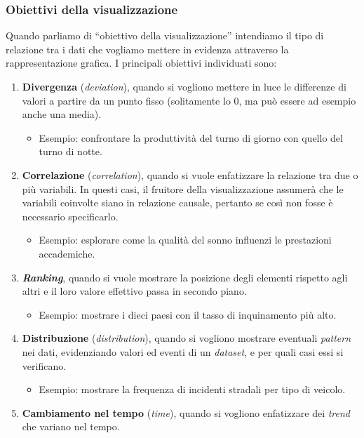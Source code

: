 \subsubsection{Obiettivi della visualizzazione}\label{subsubsec:obj}
Quando parliamo di ``obiettivo della visualizzazione'' intendiamo il tipo di relazione tra i dati che vogliamo mettere in evidenza attraverso
la rappresentazione grafica. I principali obiettivi individuati sono:
\begin{enumerate}
    \item \textbf{Divergenza} (\emph{deviation}), quando si vogliono mettere in luce le differenze di valori a partire da un punto fisso (solitamente lo 0, ma può essere
    ad esempio anche una media).
    \begin{itemize}
        \item Esempio: confrontare la produttività del turno di giorno con quello del turno di notte.
    \end{itemize}
    \item \textbf{Correlazione} (\emph{correlation}), quando si vuole enfatizzare la relazione tra due o più variabili. In questi casi, il fruitore della visualizzazione assumerà che le 
    variabili coinvolte siano in relazione causale, pertanto se così non fosse è necessario specificarlo.
    \begin{itemize}
        \item Esempio: esplorare come la qualità del sonno influenzi le prestazioni accademiche.
    \end{itemize}
    \item \textbf{\emph{Ranking}}, quando si vuole mostrare la posizione degli elementi rispetto agli altri e il loro valore effettivo passa in secondo piano.
    \begin{itemize}
        \item Esempio: mostrare i dieci paesi con il tasso di inquinamento più alto.
    \end{itemize}
    \item \textbf{Distribuzione} (\emph{distribution}), quando si vogliono mostrare eventuali \emph{pattern} nei dati, evidenziando valori ed eventi di un \emph{dataset}, e per quali casi essi si verificano. 
    \begin{itemize}
        \item Esempio: mostrare la frequenza di incidenti stradali per tipo di veicolo.
    \end{itemize}
    \item \textbf{Cambiamento nel tempo} (\emph{time}), quando si vogliono enfatizzare dei \emph{trend} che variano nel tempo.

\end{enumerate}
